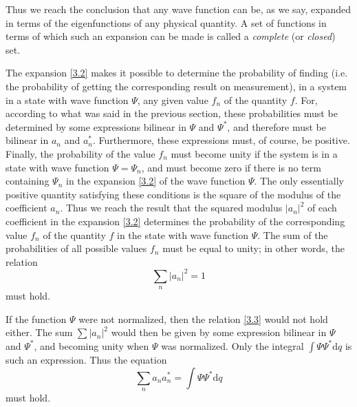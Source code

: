 Thus we reach the conclusion that any wave function can be, as we say, expanded in terms of the eigenfunctions of any physical quantity. A set of functions in terms of which such an expansion can be made is called a \textit{complete} (or \textit{closed}) set.

The expansion \eqref{3.2} makes it possible to determine the probability of finding (i.e. the probability of getting the corresponding result on measurement), in a system in a state with wave function $ \Psi $, any given value $ f_n $ of the quantity $ f $. For, according to what was said in the previous section, these probabilities must be determined by some expressions bilinear in $ \Psi $ and $ \Psi^* $, and therefore must be bilinear in $ a_n $ and $ a_n^* $. Furthermore, these expressions must, of course, be positive. Finally, the probability of the value $ f_n $ must become unity if the system is in a state with wave function $ \Psi=\Psi_n $, and must become zero if there is no term containing $ \Psi_n $ in the expansion \eqref{3.2} of the wave function $ \Psi $. The only essentially positive quantity satisfying these conditions is the square of the modulus of the coefficient $ a_n $. Thus we reach the result that the squared modulus $ |a_n|^2 $ of each coefficient in the expansion \eqref{3.2} determines the probability of the corresponding value $ f_n $ of the quantity $ f $ in the state with wave function $ \Psi $. The sum of the probabilities of all possible values $ f_n $ must be equal to unity; in other words, the relation
\begin{equation}\label{3.3}
\sum_{n}|a_n|^2=1
\end{equation}
must hold.

If the function $ \Psi $ were not normalized, then the relation \eqref{3.3} would not hold either. The sum $ \sum|a_n|^2 $ would then be given by some expression bilinear in $ \Psi $ and $ \Psi^* $, and becoming unity when $ \Psi $ was normalized. Only the integral $ \int\Psi\Psi^*\mathrm{d}q $ is such an expression. Thus the equation
\begin{equation}\label{3.4}
\sum_{n}a_na_n^*=\int\Psi\Psi^*\mathrm{d}q
\end{equation}
must hold.

